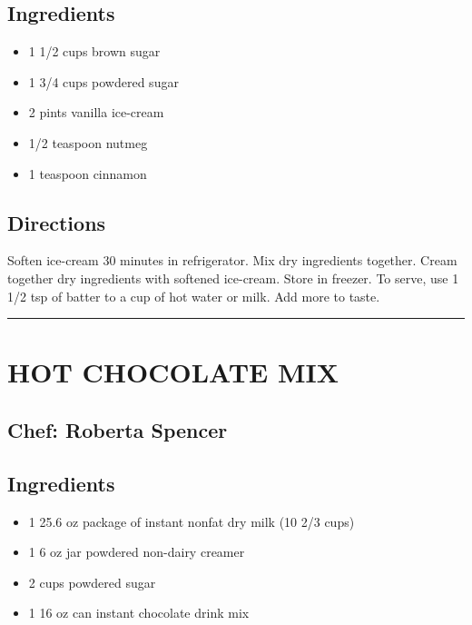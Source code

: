 \documentclass[
]{book}
\providecommand{\tightlist}{%
  \setlength{\itemsep}{0pt}\setlength{\parskip}{0pt}}
\begin{document}
\hypertarget{ingredients-6}{%
\subsection*{Ingredients}\label{ingredients-6}}


\begin{itemize}
\tightlist
\item
  1 1/2 cups brown sugar
\item
  1 3/4 cups powdered sugar
\item
  2 pints vanilla ice-cream
\item
  1/2 teaspoon nutmeg
\item
  1 teaspoon cinnamon
\end{itemize}

\hypertarget{directions-6}{%
\subsection*{Directions}\label{directions-6}}


Soften ice-cream 30 minutes in refrigerator. Mix dry ingredients together.
Cream together dry ingredients with softened ice-cream.
Store in freezer. To serve, use 1 1/2 tsp of batter to a cup of hot water or milk. Add more to taste.

\begin{center}\rule{0.5\linewidth}{0.5pt}\end{center}

\hypertarget{hot-chocolate-mix}{%
\section*{HOT CHOCOLATE MIX}\label{hot-chocolate-mix}}


\hypertarget{chef-roberta-spencer}{%
\subsection*{Chef: Roberta Spencer}\label{chef-roberta-spencer}}


\hypertarget{ingredients-7}{%
\subsection*{Ingredients}\label{ingredients-7}}


\begin{itemize}
\tightlist
\item
  1 25.6 oz package of instant nonfat dry milk (10 2/3 cups)
\item
  1 6 oz jar powdered non-dairy creamer
\item
  2 cups powdered sugar
\item
  1 16 oz can instant chocolate drink mix
\end{itemize}
\end{document}
